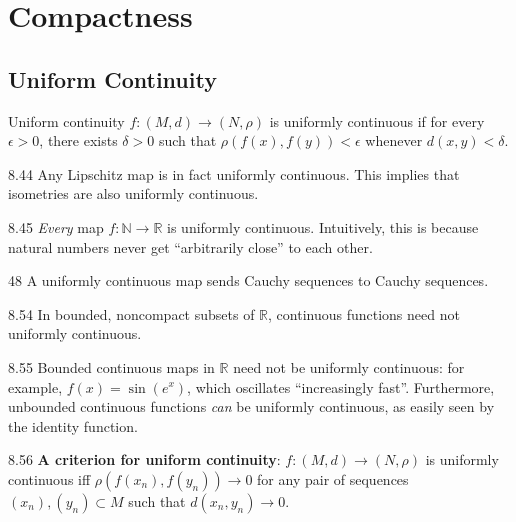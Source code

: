 \chapter{Compactness}

\section{Uniform Continuity}

\begin{definition}{Uniform continuity}
    $f: (M, d) \rightarrow (N, \rho)$ is uniformly continuous if for every $\epsilon > 0$, there exists $\delta > 0$ such that $\rho(f(x), f(y)) < \epsilon$ whenever $d(x, y) < \delta$. 
\end{definition}

\begin{exercise}{8.44}
    Any Lipschitz map is in fact uniformly continuous.
    This implies that isometries are also uniformly continuous.
\end{exercise}

\begin{exercise}{8.45}
    \textit{Every} map $f: \mathbb{N} \rightarrow \mathbb{R}$ is uniformly continuous.
    Intuitively, this is because natural numbers never get ``arbitrarily close'' to each other.
\end{exercise}

\begin{exercise}{48}
    A uniformly continuous map sends Cauchy sequences to Cauchy sequences.
\end{exercise}

\begin{exercise}{8.54}
    In bounded, noncompact subsets of $\mathbb{R}$, continuous functions need not uniformly continuous.
\end{exercise}

\begin{exercise}{8.55}
    Bounded continuous maps in $\mathbb{R}$ need not be uniformly continuous: for example, $f(x) = \sin(e^x)$, which oscillates ``increasingly fast''.
    Furthermore, unbounded continuous functions \textit{can} be uniformly continuous, as easily seen by the identity function.
\end{exercise}

\begin{exercise}{8.56}
    \textbf{A criterion for uniform continuity}: $f: (M, d) \rightarrow (N, \rho)$ is uniformly continuous iff $\rho(f(x_n), f(y_n)) \rightarrow 0$ for any pair of sequences $(x_n), (y_n) \subset M$ such that $d(x_n, y_n) \rightarrow 0$.
\end{exercise}


